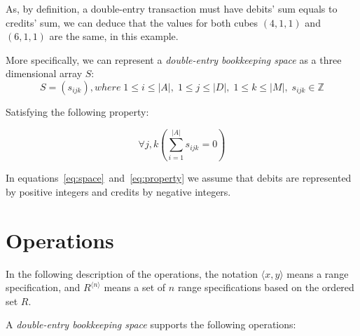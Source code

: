 \documentclass{article}
\begin{document}
As, by definition, a double-entry transaction must have debits' sum
equals to credits' sum, we can deduce that the values for both
cubes $(4,1,1)$ and $(6,1,1)$ are the same, in this example.

More specifically, we can represent a \emph{double-entry bookkeeping space} 
as a three dimensional array $S$:
\begin{equation}
	\label{eq:space}
	S = \left(s_{ijk}\right), where
	\; 1 \leq i \leq |A|, \; 1 \leq j \leq |D|, \; 1 \leq k \leq |M|, 
	\; s_{ijk} \in \mathbb{Z}
\end{equation}

Satisfying the following property:

\begin{equation}
	\label{eq:property}
	\forall j, k\left(\sum_{i=1}^{|A|}{s_{ijk}} = 0\right)
\end{equation}

In equations~\eqref{eq:space}~and~\eqref{eq:property}
we assume that debits are represented by positive integers
and credits by negative integers.

\section{Operations}

In the following description of the operations, the notation $\langle x, y \rangle$ means
a range specification, and $R^{\langle n \rangle}$ means a set of $n$
range specifications based on the ordered set $R$.

A \emph{double-entry bookkeeping space} supports the following operations:
\end{document}
